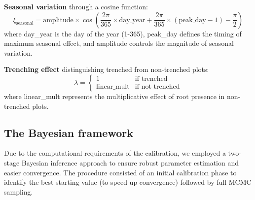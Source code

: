 \documentclass[12pt,a4paper]{article}
\begin{document}
\textbf{Seasonal variation} through a cosine function:
\begin{equation}
\xi_{\text{seasonal}} = \text{amplitude} \times \cos\left(\frac{2\pi}{365} \times \text{day\_year} + \frac{2\pi}{365} \times (\text{peak\_day} - 1) - \frac{\pi}{2}\right)
\end{equation}
where day\_year is the day of the year (1-365), peak\_day defines the timing of maximum seasonal effect, and amplitude controls the magnitude of seasonal variation.

\textbf{Trenching effect} distinguishing trenched from non-trenched plots:
\begin{equation}
\lambda = \begin{cases}
1 & \text{if trenched} \\
\text{linear\_mult} & \text{if not trenched}
\end{cases}
\end{equation}
where linear\_mult represents the multiplicative effect of root presence in non-trenched plots.

\subsection{The Bayesian framework}
Due to the computational requirements of the calibration, we employed a two-stage Bayesian inference approach to ensure robust parameter estimation and easier convergence. The procedure consisted of an initial calibration phase to identify the best starting value (to speed up convergence) followed by full MCMC sampling.
\end{document}

